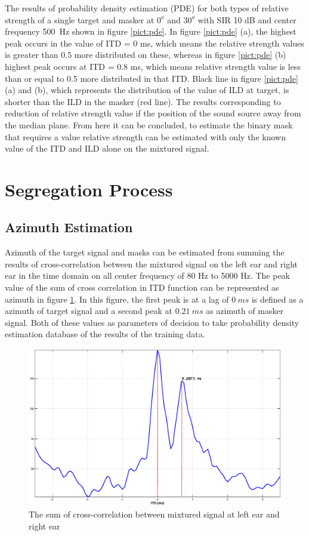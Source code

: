 \documentclass[a4paper]{jpconf}
\begin{document}
The results of probability density estimation (PDE) for both types of relative strength of a single target and masker at $0^o$ and $30^o$ with SIR 10 dB and center frequency 500~Hz shown in figure \ref{pict:pde}. In figure \ref{pict:pde} (a), the highest peak occurs in the value of ITD = 0 ms, which means the relative strength values is greater than 0.5 more distributed on these, whereas in figure \ref{pict:pde} (b) highest peak occurs at ITD = 0.8 ms, which means relative strength value is less than or equal to 0.5 more distributed in that ITD. Black line in figure \ref{pict:pde} (a) and (b), which represents the distribution of the value of ILD at target, is shorter than the ILD in the masker (red line). The results corresponding to reduction of relative strength value if the position of the sound source away from the median plane. From here it can be concluded, to estimate the binary mask that requires a value relative strength can be estimated with only the known value of the ITD and ILD alone on the mixtured signal.

\section{Segregation Process}
\subsection{Azimuth Estimation}
Azimuth of the target signal and masks can be estimated from summing the results of cross-correlation between the mixtured signal on the left ear and right ear in the time domain on all center frequency of 80 Hz to 5000 Hz. The peak value of the sum of cross correlation in ITD function can be represented as azimuth in figure \ref{pict:azimuth}. In this figure, the first peak is at a lag of $0~ms$ is defined as a azimuth of target signal and a second peak at $0.21~ms$ as azimuth of masker signal. Both of these values as parameters of decision to take probability density estimation database of the results of the training data.

\begin{figure}[h]
    \centering
    \includegraphics[width=5.5in]{pict/azimuth.eps}
    \caption{\label{pict:azimuth}The sum of cross-correlation between mixtured signal at left ear and right ear}
\end{figure} 
\end{document}
